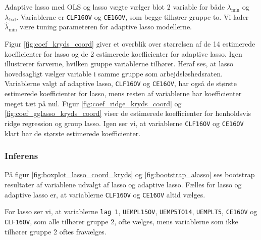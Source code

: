 Adaptive lasso med OLS og lasso vægte vælger blot 2 variable for både  $\lambda_{\min}$ og $\lambda_{1\text{sd}}$. 
Variablerne er \texttt{CLF16OV} og \texttt{CE16OV}, som begge tilhører gruppe to. 
Vi lader $\widehat{\lambda}_{\min}$ være tuning parameteren for adaptive lasso modellerne. 

Figur \ref{fig:coef_kryds_coord} giver et overblik over størrelsen af de 14 estimerede koefficienter for lasso og de 2 estimerede koefficienter for adaptive lasso.
Igen illustrerer farverne, hvilken gruppe variablerne tilhører.
Heraf ses, at lasso hovedsagligt vælger variable i samme gruppe som arbejdsløshedsraten.
Variablerne valgt af adaptive lasso, \texttt{CLF16OV} og \texttt{CE16OV}, har også de største estimerede koefficienter for lasso, mens resten af variablerne har koefficienter meget tæt på nul. 
Figur \ref{fig:coef_ridge_kryds_coord} og \ref{fig:coef_gglasso_kryds_coord} viser de estimerede koefficienter for henholdsvis ridge regression og group lasso.
Igen ser vi, at variablerne \texttt{CLF16OV} og \texttt{CE16OV} klart har de største estimerede koefficienter.    
%

\newpage
\subsubsection{Inferens}
På figur \ref{fig:boxplot_lasso_coord_kryds} og \ref{fig:bootstrap_alasso} ses bootstrap resultater af variablene udvalgt af lasso og adaptive lasso.
Fælles for lasso og adaptive lasso er, at variablerne \texttt{CLF16OV} og \texttt{CE16OV} altid vælges.

For lasso ser vi, at variablerne \texttt{lag 1}, \texttt{UEMPL15OV}, \texttt{UEMP5TO14}, \texttt{UEMPLT5}, \texttt{CE16OV} og \texttt{CLF16OV}, som alle tilhører gruppe 2, ofte vælges, mens variablerne som ikke tilhører gruppe 2 oftes fravælges.
%
%

